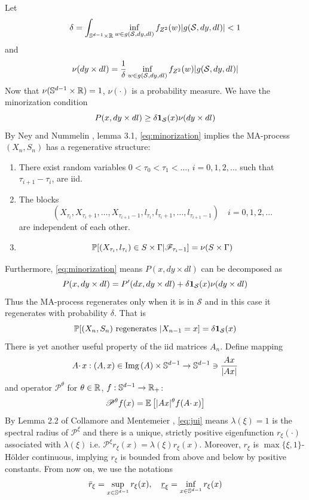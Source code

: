 \documentclass[aoas,preprint]{imsart}
\numberwithin{equation}{section}
\theoremstyle{plain}
\begin{document}
Let
\[
\delta = \int_{\sphere^{d-1} \times \reals}
\inf_{w \in g(\mathcal S, dy, dl)} f_{Z^2}(w)
| g(\mathcal S, dy, dl)| < 1
\]
and
\[
\nu(dy \times dl) = {1 \over \delta}
\inf_{w \in g(\mathcal S, dy, dl)} f_{Z^2}(w)
| g(\mathcal S, dy, dl)|
\]
Now that $\nu(\sphere^{d-1} \times \reals) = 1$, $\nu(\cdot)$ is a
probability measure. We have the minorization condition
\begin{equation}
  \label{eq:minorization}
  P(x, dy \times dl) \geq \delta \I_{\mathcal S}(x) \nu(dy \times dl)
\end{equation}
By Ney and Nummelin \cite{ney:nummelin:1987}, lemma 3.1,
\eqref{eq:minorization} implies the MA-process $(X_n, S_n)$ has a
regenerative structure:
\begin{enumerate}[(1)]
\item There exist random variables $0 < \tau_0 < \tau_1 < \dots$,
  $i = 0, 1, 2, \dots$ such that $\tau_{i+1} - \tau_i$,  are iid.
\item The blocks
  \[
  (X_{\tau_i}, X_{\tau_i + 1}, \dots, X_{\tau_{i+1} - 1}, l_{\tau_i},
  l_{\tau_i + 1}, \dots, l_{\tau_{i+1} - 1}) \quad
  i = 0, 1, 2, \dots
  \]
  are independent of each other.
\item
  \[
  \P[(X_{\tau_i}, l_{\tau_i}) \in S \times \Gamma | \mathscr F_{\tau_i - 1}]
  = \nu(S \times \Gamma)
  \]
\end{enumerate}
Furthermore, \eqref{eq:minorization} means
$P(x, dy \times dl)$ can be decomposed as
\[
P(x, dy \times dl) = P'(dx, dy \times dl)
+
\delta \I_{\mathcal S}(x) \nu(dy \times dl)
\]
Thus the MA-process regenerates only when it is in $\mathcal S$ and in
this case it regenerates with probability $\delta$. That is
\[
\P[(X_n, S_n) \text{ regenerates } | X_{n-1} = x] = \delta \I_{\mathcal S}(x)
\]
There is yet another useful property of the iid matrices $A_n$. Define
mapping
\[
A \cdotp x: (A, x) \in \img(A) \times \sphere^{d-1} \to
\sphere^{d-1} \ni {
  A x \over |A x|
}
\]
and operator $\mathscr P^\theta$ for $\theta \in \reals$,
$f: \sphere^{d-1} \to \reals_+$:
\[
\mathscr P^\theta f(x) =
\E \left[
  |A x|^\theta f(A \cdotp x)
\right]
\]
By Lemma 2.2 of Collamore and Mentemeier
\cite{collamore:mentemeier:2016}, \eqref{eq:jui} means
$\lambda(\xi) = 1$ is the spectral radius of $\mathscr P^\xi$ and
there is a unique, strictly positive eigenfunction $r_\xi(\cdot)$
associated with $\lambda(\xi)$ i.e.
$\mathscr P^\xi r_\xi(x) = \lambda(\xi) r_\xi(x)$.
Moreover, $r_\xi$ is $\max\{\xi, 1\}$-H\"older continuous, implying
$r_\xi$ is bounded from above and below by positive constants. From
now on, we use the notations
\[
\bar r_\xi = \sup_{x \in \sphere^{d-1}} r_\xi(x),\quad
\underline r_\xi = \inf_{x \in \sphere^{d-1}} r_\xi(x)
\]
\end{document}
